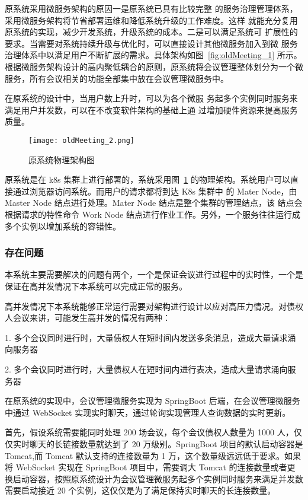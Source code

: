 原系统采用微服务架构的原因一是原系统已具有比较完整
的服务治理管理体系，采用微服务架构将节省部署运维和降低系统升级的工作难度。这样
就能充分复用原系统的实现，减少开发系统，升级系统的成本。二是可以满足系统可
扩展性的要求。当需要对系统持续升级与优化时，可以直接设计其他微服务加入到微
服务治理体系中以满足用户不断扩展的需求。具体架构如图~\ref{fig:oldMeeting_1}\cite{Wang2021} 所示。根据微服务架构设计的高内聚低耦合的原则，原系统将会议管理整体划分为一个微服务，所有会议相关的功能全部集中放在会议管理微服务中。

在原系统的设计中，当用户数上升时，可以为各个微服
务起多个实例同时服务来满足用户并发数，可以在不改变软件架构的基础上通
过增加硬件资源来提高服务质量。

\begin{figure}[!htp]
  \centering
  \texttt{[image: oldMeeting\_2.png]}
  \caption[原物理架构]
    {原系统物理架构图\cite{Wang2021}}
 \label{fig:oldMeeting_2}
\end{figure}

原系统是在 k8s 集群上进行部署的，系统采用图~\ref{fig:oldMeeting_2}
的物理架构。系统用户可以直接通过浏览器访问系统。而用户的请求都将到达 K8s 集群中
的 Mater Node，由 Master Node 结点进行处理。Mater Node 结点是整个集群的管理结点，该
结点会根据请求的特性命令 Work Node 结点进行作业工作。另外，一个服务往往运行成多个实例以增加系统的容错性。


\nocite{Wang2021}
\subsubsection{存在问题}
本系统主要需要解决的问题有两个，一个是保证会议进行过程中的实时性，一个是保证在高并发情况下本系统可以完成正常的服务。

高并发情况下本系统能够正常运行需要对架构进行设计以应对高压力情况。对债权人会议来讲，可能发生高并发的情况有两种：

1. 多个会议同时进行时，大量债权人在短时间内发送多条消息，造成大量请求涌向服务器

2. 多个会议同时进行时，大量债权人在短时间内进行表决，造成大量请求涌向服务器

在原系统的实现中，会议管理微服务实现为 SpringBoot 后端，在会议管理微服务中通过 WebSocket 实现实时聊天，通过轮询实现管理人查询数据的实时更新。

首先，假设系统需要能同时处理 200 场会议，每个会议债权人数量为 1000 人，仅仅实时聊天的长链接数量就达到了 20 万级别。SpringBoot 项目的默认启动容器是 Tomcat,而 Tomcat 默认支持的连接数量为 1 万，这个数量级远远低于要求。如果将 WebSocket 实现在 SpringBoot 项目中，需要调大 Tomcat 的连接数量或者更换启动容器，按照原系统设计为会议管理微服务起多个实例同时服务来满足并发数需要启动接近 20 个实例，这仅仅是为了满足保持实时聊天的长连接数量。


